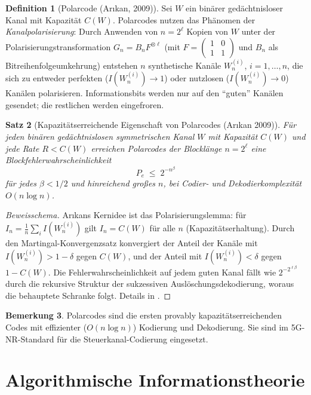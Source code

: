 \documentclass[12pt,a4paper]{amsart}
\newtheorem{theorem}{Satz}[section]
\theoremstyle{definition}
\newtheorem{definition}[theorem]{Definition}
\newtheorem{bemerkung}[theorem]{Bemerkung}
\theoremstyle{remark}
\begin{document}
\begin{definition}[Polarcode (Ar\i{}kan, 2009)]
Sei $W$ ein binärer gedächtnisloser Kanal mit Kapazität $C(W)$. Polarcodes
nutzen das Phänomen der \emph{Kanalpolarisierung}: Durch Anwenden von $n = 2^\ell$
Kopien von $W$ unter der Polarisierungstransformation $G_n = B_n F^{\otimes \ell}$
(mit $F = \begin{pmatrix}1&0\\1&1\end{pmatrix}$ und $B_n$ als Bitreihenfolgeumkehrung)
entstehen $n$ synthetische Kanäle $W_n^{(i)}$, $i = 1, \ldots, n$, die sich zu
entweder perfekten ($I(W_n^{(i)}) \to 1$) oder nutzlosen ($I(W_n^{(i)}) \to 0$)
Kanälen polarisieren. Informationsbits werden nur auf den ``guten'' Kanälen gesendet;
die restlichen werden eingefroren.
\end{definition}

\begin{theorem}[Kapazitätserreichende Eigenschaft von Polarcodes (Ar\i{}kan 2009)]
\label{satz:polar}
Für jeden binären gedächtnislosen symmetrischen Kanal $W$ mit Kapazität $C(W)$
und jede Rate $R < C(W)$ erreichen Polarcodes der Blocklänge $n = 2^\ell$ eine
Blockfehlerwahrscheinlichkeit
\[
  P_e \;\leq\; 2^{-n^\beta}
\]
für jedes $\beta < 1/2$ und hinreichend großes $n$, bei Codier- und
Dekodierkomplexität $O(n \log n)$.
\end{theorem}
\begin{proof}[Beweisschema]
Ar\i{}kans Kernidee ist das Polarisierungslemma: für $I_n = \frac{1}{n}\sum_i
I(W_n^{(i)})$ gilt $I_n = C(W)$ für alle $n$ (Kapazitätserhaltung). Durch den
Martingal-Konvergenzsatz konvergiert der Anteil der Kanäle mit $I(W_n^{(i)})
> 1-\delta$ gegen $C(W)$, und der Anteil mit $I(W_n^{(i)}) < \delta$ gegen
$1-C(W)$. Die Fehlerwahrscheinlichkeit auf jedem guten Kanal fällt wie
$2^{-2^{\ell\beta}}$ durch die rekursive Struktur der sukzessiven Auslöschungsdekodierung,
woraus die behauptete Schranke folgt. Details in \cite{Arikan2009}.
\end{proof}

\begin{bemerkung}
Polarcodes sind die ersten provably kapazitätserreichenden Codes mit effizienter
($O(n\log n)$) Kodierung und Dekodierung. Sie sind im 5G-NR-Standard für die
Steuerkanal-Codierung eingesetzt.
\end{bemerkung}

\section{Algorithmische Informationstheorie}
\end{document}
